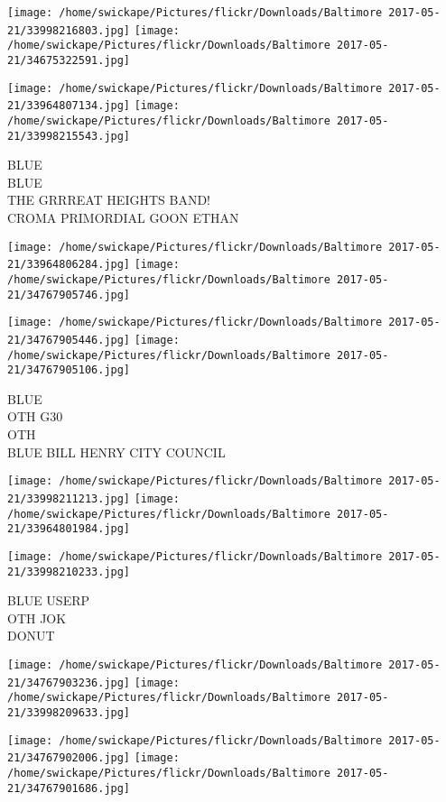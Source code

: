 \documentclass[10pt,letterpaper]{article}
\begin{document}
\texttt{[image: /home/swickape/Pictures/flickr/Downloads/Baltimore 2017-05-21/33998216803.jpg]}
\texttt{[image: /home/swickape/Pictures/flickr/Downloads/Baltimore 2017-05-21/34675322591.jpg]}

\texttt{[image: /home/swickape/Pictures/flickr/Downloads/Baltimore 2017-05-21/33964807134.jpg]}
\texttt{[image: /home/swickape/Pictures/flickr/Downloads/Baltimore 2017-05-21/33998215543.jpg]}

BLUE\\
BLUE\\
THE GRRREAT HEIGHTS BAND!\\
CROMA PRIMORDIAL GOON ETHAN
\pagebreak

\texttt{[image: /home/swickape/Pictures/flickr/Downloads/Baltimore 2017-05-21/33964806284.jpg]}
\texttt{[image: /home/swickape/Pictures/flickr/Downloads/Baltimore 2017-05-21/34767905746.jpg]}

\texttt{[image: /home/swickape/Pictures/flickr/Downloads/Baltimore 2017-05-21/34767905446.jpg]}
\texttt{[image: /home/swickape/Pictures/flickr/Downloads/Baltimore 2017-05-21/34767905106.jpg]}

BLUE\\
OTH G30\\
OTH\\
BLUE BILL HENRY CITY COUNCIL
\pagebreak

\texttt{[image: /home/swickape/Pictures/flickr/Downloads/Baltimore 2017-05-21/33998211213.jpg]}
\texttt{[image: /home/swickape/Pictures/flickr/Downloads/Baltimore 2017-05-21/33964801984.jpg]}

\vspace{0.25in}
\texttt{[image: /home/swickape/Pictures/flickr/Downloads/Baltimore 2017-05-21/33998210233.jpg]}

BLUE USERP\\
OTH JOK\\
DONUT
\pagebreak

\texttt{[image: /home/swickape/Pictures/flickr/Downloads/Baltimore 2017-05-21/34767903236.jpg]}
\texttt{[image: /home/swickape/Pictures/flickr/Downloads/Baltimore 2017-05-21/33998209633.jpg]}

\texttt{[image: /home/swickape/Pictures/flickr/Downloads/Baltimore 2017-05-21/34767902006.jpg]}
\texttt{[image: /home/swickape/Pictures/flickr/Downloads/Baltimore 2017-05-21/34767901686.jpg]}
\end{document}
